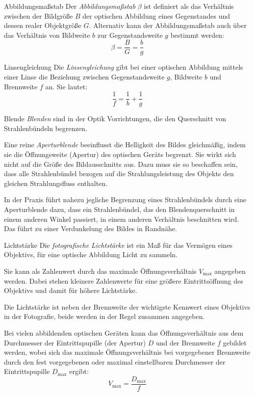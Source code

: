\begin{defi}{Abbildungsmaßstab}
    Der \emph{Abbildungsmaßstab} $\beta$ ist definiert als das Verhältnis zwischen der Bildgröße $B$ der optischen Abbildung eines Gegenstandes und dessen realer Objektgröße $G$.
    Alternativ kann der Abbildungsmaßstab auch über das Verhältnis von Bildweite $b$ zur Gegenstandsweite $g$ bestimmt werden:
    \[
        \beta = \frac{B}{G} = \frac{b}{g}
    \]
\end{defi}

\begin{defi}{Linsengleichung}
    Die \emph{Linsengleichung} gibt bei einer optischen Abbildung mittels einer Linse die Beziehung zwischen Gegenstandsweite $g$, Bildweite $b$ und Brennweite $f$ an.
    Sie lautet:
    \[
        \frac{1}{f} = \frac{1}{b} + \frac{1}{g}
    \]
\end{defi}

\begin{defi}[Kamera]{Blende}
    \emph{Blenden} sind in der Optik Vorrichtungen, die den Querschnitt von Strahlenbündeln begrenzen.

    Eine reine \emph{Aperturblende} beeinflusst die Helligkeit des Bildes gleichmäßig, indem sie die Öffnungsweite (Apertur) des optischen Geräts begrenzt.
    Sie wirkt sich nicht auf die Größe des Bildausschnitts aus.
    Dazu muss sie so beschaffen sein, dass alle Strahlenbündel bezogen auf die Strahlungsleistung des Objekts den gleichen Strahlungsfluss enthalten.

    In der Praxis führt nahezu jegliche Begrenzung eines Strahlenbündels durch eine Aperturblende dazu, dass ein Strahlenbündel, das den Blendenquerschnitt in einem anderen Winkel passiert, in einem anderen Verhältnis beschnitten wird.
    Das führt zu einer Verdunkelung des Bildes in Randnähe.
\end{defi}

\begin{defi}{Lichtstärke}
    Die \emph{fotografische Lichtstärke} ist ein Maß für das Vermögen eines Objektivs, für eine optische Abbildung Licht zu sammeln.

    Sie kann als Zahlenwert durch das maximale Öffnungsverhältnis $V_{\max}$ angegeben werden.
    Dabei stehen kleinere Zahlenwerte für eine größere Eintrittsöffnung des Objektivs und damit für höhere Lichtstärke.

    Die Lichtstärke ist neben der Brennweite der wichtigste Kennwert eines Objektivs in der Fotografie, beide werden in der Regel zusammen angegeben.

    Bei vielen abbildenden optischen Geräten kann das Öffnungsverhältnis aus dem Durchmesser der Eintrittspupille (der Apertur) $D$ und der Brennweite $f$ gebildet werden, wobei sich das maximale Öffnungsverhältnis bei vorgegebener Brennweite durch den fest vorgegebenen oder maximal einstellbaren Durchmesser der Eintrittspupille $D_{\max}$ ergibt:
    \[
        V_{\max} = \frac{D_{\max}}{f}
    \]
\end{defi}


